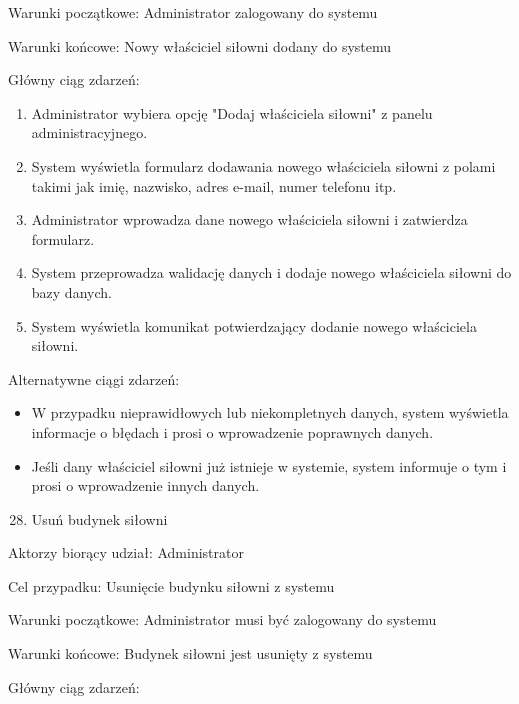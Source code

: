 \documentclass[
]{article}
\providecommand{\tightlist}{%
  \setlength{\itemsep}{0pt}\setlength{\parskip}{0pt}}
\begin{document}
{Warunki początkowe: Administrator zalogowany do systemu}

{Warunki końcowe: Nowy właściciel siłowni dodany do systemu}

{Główny ciąg zdarzeń:}

\begin{enumerate}
\tightlist
\item
  {Administrator wybiera opcję "Dodaj właściciela siłowni" z panelu
  administracyjnego.}
\item
  {System wyświetla formularz dodawania nowego właściciela siłowni z
  polami takimi jak imię, nazwisko, adres e-mail, numer telefonu itp.}
\item
  {Administrator wprowadza dane nowego właściciela siłowni i zatwierdza
  formularz.}
\item
  {System przeprowadza walidację danych i dodaje nowego właściciela
  siłowni do bazy danych.}
\item
  {System wyświetla komunikat potwierdzający dodanie nowego właściciela
  siłowni.}
\end{enumerate}

{Alternatywne ciągi zdarzeń:}

\begin{itemize}
\tightlist
\item
  {W przypadku nieprawidłowych lub niekompletnych danych, system
  wyświetla informacje o błędach i prosi o wprowadzenie poprawnych
  danych.}
\item
  {Jeśli dany właściciel siłowni już istnieje w systemie, system
  informuje o tym i prosi o wprowadzenie innych danych.}
\end{itemize}

{}

{}

\begin{enumerate}
\setcounter{enumi}{27}
\tightlist
\item
  {Usuń budynek siłowni}
\end{enumerate}

{Aktorzy biorący udział: Administrator}

{Cel przypadku: Usunięcie budynku siłowni z systemu}

{Warunki początkowe: Administrator musi być zalogowany do systemu}

{Warunki końcowe: Budynek siłowni jest usunięty z systemu}

{Główny ciąg zdarzeń:}
\end{document}
